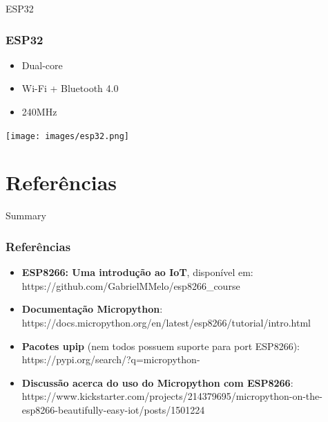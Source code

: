 \documentclass[10pt, compress]{beamer}
\begin{document}
\begin{frame}{ESP32}
  \frametitle{ESP32}
  \vspace{15pt}
  \begin{itemize}
    \item Dual-core
    \item Wi-Fi + Bluetooth 4.0
    \item 240MHz
  \end{itemize}

  \begin{center}
    \texttt{[image: images/esp32.png]}\\
  \end{center}
\end{frame}

\section{Referências}

\begin{frame}{Summary}
  \frametitle{Referências}
  \vspace{15pt}
  \begin{itemize}
    \item \textbf{ESP8266: Uma introdução ao IoT}, disponível em: https://github.com/GabrielMMelo/esp8266\_course \vspace{15pt}
    \item \textbf{Documentação Micropython}: https://docs.micropython.org/en/latest/esp8266/tutorial/intro.html \vspace{5pt}
    \item \textbf{Pacotes upip} (nem todos possuem suporte para port ESP8266): https://pypi.org/search/?q=micropython- \vspace{15pt}
    \item \textbf{Discussão acerca do uso do Micropython com ESP8266}: https://www.kickstarter.com/projects/214379695/micropython-on-the-esp8266-beautifully-easy-iot/posts/1501224 \vspace{5pt}
  \end{itemize}
\end{frame}



\end{document}
